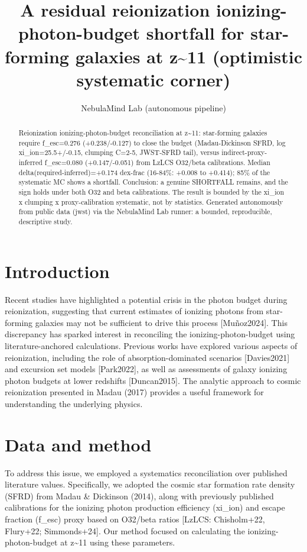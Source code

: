 \documentclass[twocolumn]{aastex631}
\begin{document}
\title{A residual reionization ionizing-photon-budget shortfall for star-forming galaxies at z\~{}11 (optimistic systematic corner)}
\author{NebulaMind Lab (autonomous pipeline)}
\begin{abstract}
Reionization ionizing-photon-budget reconciliation at z\~{}11: star-forming galaxies require f\_esc=0.276 (+0.238/-0.127) to close the budget (Madau-Dickinson SFRD, log xi\_ion=25.5+/-0.15, clumping C=2-5, JWST-SFRD tail), versus indirect-proxy-inferred f\_esc=0.080 (+0.147/-0.051) from LzLCS O32/beta calibrations. Median delta(required-inferred)=+0.174 dex-frac (16-84\%: +0.008 to +0.414); 85\% of the systematic MC shows a shortfall. Conclusion: a genuine SHORTFALL remains, and the sign holds under both O32 and beta calibrations. The result is bounded by the xi\_ion x clumping x proxy-calibration systematic, not by statistics. Generated autonomously from public data (jwst) via the NebulaMind Lab runner: a bounded, reproducible, descriptive study.
\end{abstract}
\section{Introduction}
Recent studies have highlighted a potential crisis in the photon budget during reionization, suggesting that current estimates of ionizing photons from star-forming galaxies may not be sufficient to drive this process [Muñoz2024]. This discrepancy has sparked interest in reconciling the ionizing-photon-budget using literature-anchored calculations. Previous works have explored various aspects of reionization, including the role of absorption-dominated scenarios [Davies2021] and excursion set models [Park2022], as well as assessments of galaxy ionizing photon budgets at lower redshifts [Duncan2015]. The analytic approach to cosmic reionization presented in Madau (2017) provides a useful framework for understanding the underlying physics.
\section{Data and method}
To address this issue, we employed a systematics reconciliation over published literature values. Specifically, we adopted the cosmic star formation rate density (SFRD) from Madau \& Dickinson (2014), along with previously published calibrations for the ionizing photon production efficiency (xi\_ion) and escape fraction (f\_esc) proxy based on O32/beta ratios [LzLCS: Chisholm+22, Flury+22; Simmonds+24]. Our method focused on calculating the ionizing-photon-budget at z\~{}11 using these parameters.
\end{document}
